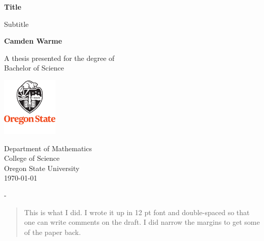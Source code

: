\documentclass[12pt]{report}
\begin{document}
\begin{titlepage}
\thispagestyle{empty} 
   \begin{center}
       \vspace*{1cm}

       \textbf{Title\rm}

       \vspace{0.5cm}
        Subtitle
            
       \vspace{1.5cm}

       \textbf{Camden Warme}

       \vfill
            
       A thesis presented for the degree of\\
       Bachelor of Science
            
       \vspace{0.8cm}
     
       \includegraphics[width=0.2\textwidth]{OSU Logo.pdf}
            
       Department of Mathematics\\
       College of Science\\
       Oregon State University\\
        \today
            
   \end{center}
-\end{titlepage}
 \doublespacing
\setcounter{page}{1}

\begin{abstract}
This is what I did.  I wrote it up in 12 pt font and double-spaced so that one can write comments on the draft. I did narrow the margins to get some of the paper back.  
\end{abstract}

\newpage


\tableofcontents
\listoffigures
\listoftables
\newpage

\end{document}
